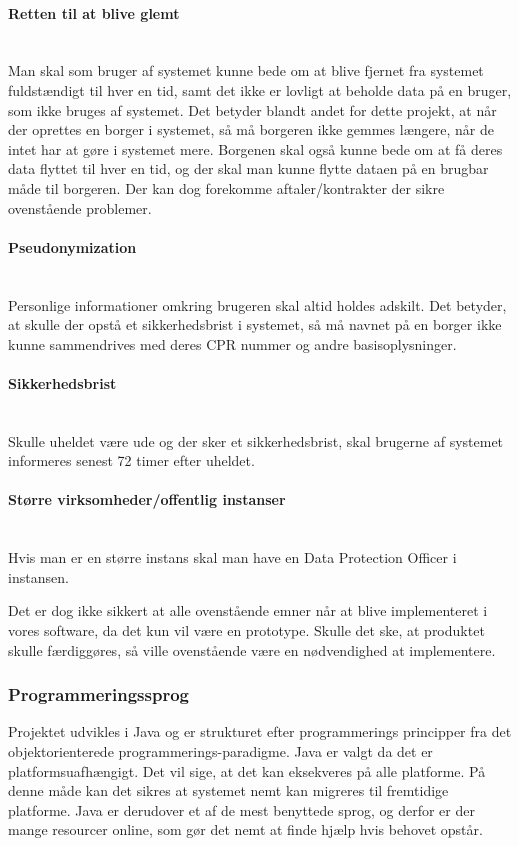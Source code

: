 \documentclass[../../main.tex]{subfiles}
\begin{document}
\paragraph{Retten til at blive glemt}\mbox{}\\
Man skal som bruger af systemet kunne bede om at blive fjernet fra systemet fuldstændigt til hver en tid, samt det ikke er lovligt at beholde data på en bruger, som ikke bruges af systemet. Det betyder blandt andet for dette projekt, at når der oprettes en borger i systemet, så må borgeren ikke gemmes længere, når de intet har at gøre i systemet mere. Borgenen skal også kunne bede om at få deres data flyttet til hver en tid, og der skal man kunne flytte dataen på en brugbar måde til borgeren. Der kan dog forekomme aftaler/kontrakter der sikre ovenstående problemer.

\paragraph{Pseudonymization}\mbox{}\\ 
Personlige informationer omkring brugeren skal altid holdes adskilt. Det betyder, at skulle der opstå et sikkerhedsbrist i systemet, så må navnet på en borger ikke kunne sammendrives med deres CPR nummer og andre basisoplysninger.

\paragraph{Sikkerhedsbrist}\mbox{}\\
Skulle uheldet være ude og der sker et sikkerhedsbrist, skal brugerne af systemet informeres senest 72 timer efter uheldet.

\paragraph{Større virksomheder/offentlig instanser}\mbox{}\\ 
Hvis man er en større instans skal man have en Data Protection Officer i instansen. 

Det er dog ikke sikkert at alle ovenstående emner når at blive implementeret i vores software, da det kun vil være en prototype. Skulle det ske, at produktet skulle færdiggøres, så ville ovenstående være en nødvendighed at implementere.

\subsubsection{Programmeringssprog}
Projektet udvikles i Java og er strukturet efter programmerings principper fra det objektorienterede programmerings-paradigme. Java er valgt da det er platformsuafhængigt. Det vil sige, at det kan eksekveres på alle platforme. På denne måde kan det sikres at systemet nemt kan migreres til fremtidige platforme. Java er derudover et af de mest benyttede sprog, og derfor er der mange resourcer online, som gør det nemt at finde hjælp hvis behovet opstår.









            
\end{document}
